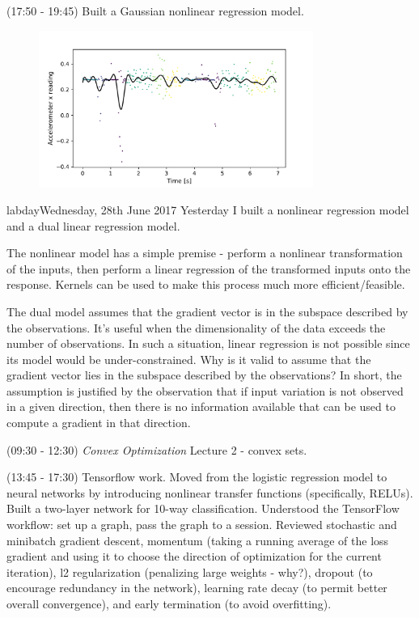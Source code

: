 \documentclass[idxtotoc,hyperref,openany]{labbook} %
\begin{document}
(17:50 - 19:45) Built a Gaussian nonlinear regression model.
\begin{figure}[h!]
\centering
\includegraphics[width=0.8\textwidth]{nonlinear_regression.pdf}
\end{figure}



labday{Wednesday, 28th June 2017}
Yesterday I built a nonlinear regression model and a dual linear regression model. 

The nonlinear model has a simple premise - perform a nonlinear transformation of the inputs, then perform a linear regression of the transformed inputs onto the response. Kernels can be used to make this process much more efficient/feasible.

The dual model assumes that the gradient vector is in the subspace described by the observations. It's useful when the dimensionality of the data exceeds the number of observations. In such a situation, linear regression is not possible since its model would be under-constrained. Why is it valid to assume that the gradient vector lies in the subspace described by the observations? In short, the assumption is justified by the observation that if input variation is not observed in a given direction, then there is no information available that can be used to compute a gradient in that direction.


(09:30 - 12:30) \emph{Convex Optimization} Lecture 2 - convex sets.

(13:45 - 17:30) Tensorflow work. Moved from the logistic regression model to neural networks by introducing nonlinear transfer functions (specifically, RELUs). Built a two-layer network for 10-way classification. Understood the TensorFlow workflow: set up a graph, pass the graph to a session. Reviewed stochastic and minibatch gradient descent, momentum (taking a running average of the loss gradient and using it to choose the direction of optimization for the current iteration), l2 regularization (penalizing  large weights - why?), dropout (to encourage redundancy in the network), learning rate decay (to permit better overall convergence), and early termination (to avoid overfitting).
\end{document}
